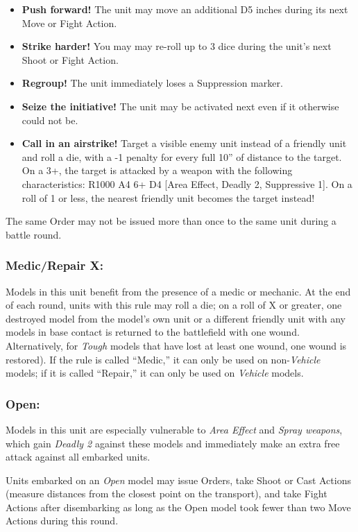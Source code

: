 \begin{multicols}{2}
\begin{itemize}
    \item \textbf{Push forward!} The unit may move an additional D5 inches during its next Move or Fight Action.
    \item \textbf{Strike harder!} You may may re-roll up to 3 dice during the unit's next Shoot or Fight Action.
    \item \textbf{Regroup!} The unit immediately loses a Suppression marker.
    \item \textbf{Seize the initiative!} The unit may be activated next even if it otherwise could not be.
    \item \textbf{Call in an airstrike!} Target a visible enemy unit instead of a friendly unit and roll a die, with a -1 penalty for every full 10'' of distance to the target. On a 3+, the target is attacked by a weapon with the following characteristics: R1000 A4 6+ D4 [Area Effect, Deadly 2, Suppressive 1]. On a roll of 1 or less, the nearest friendly unit becomes the target instead!
\end{itemize}

The same Order may not be issued more than once to the same unit during a battle round.

\subsubsection*{Medic/Repair X:} Models in this unit benefit from the presence of a medic or mechanic. At the end of each round, units with this rule may roll a die; on a roll of X or greater, one destroyed model from the model's own unit or a different friendly unit with any models in base contact is returned to the battlefield with one wound. Alternatively, for \textit{Tough} models that have lost at least one wound, one wound is restored). If the rule is called ``Medic,'' it can only be used on non-\textit{Vehicle} models; if it is called ``Repair,'' it can only be used on \textit{Vehicle} models.

\subsubsection*{Open:} Models in this unit are especially vulnerable to \textit{Area Effect} and \textit{Spray weapons}, which gain \textit{Deadly 2} against these models and immediately make an extra free attack against all embarked units.

Units embarked on an \textit{Open} model may issue Orders, take Shoot or Cast Actions (measure distances from the closest point on the transport), and take Fight Actions after disembarking as long as the Open model took fewer than two Move Actions during this round.


\end{multicols}
